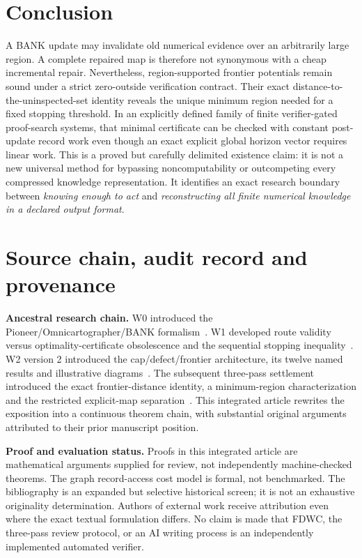 \documentclass[11pt,letterpaper]{article}
\theoremstyle{definition}
\theoremstyle{remark}
\begin{document}
\section{Conclusion}
A BANK update may invalidate old numerical evidence over an arbitrarily large region. A complete repaired map is therefore not synonymous with a cheap incremental repair. Nevertheless, region-supported frontier potentials remain sound under a strict zero-outside verification contract. Their exact distance-to-the-uninspected-set identity reveals the unique minimum region needed for a fixed stopping threshold. In an explicitly defined family of finite verifier-gated proof-search systems, that minimal certificate can be checked with constant post-update record work even though an exact explicit global horizon vector requires linear work. This is a proved but carefully delimited existence claim: it is not a new universal method for bypassing noncomputability or outcompeting every compressed knowledge representation. It identifies an exact research boundary between \emph{knowing enough to act} and \emph{reconstructing all finite numerical knowledge in a declared output format}.

\appendix
\section{Source chain, audit record and provenance}
\textbf{Ancestral research chain.} W0 introduced the Pioneer/Omnicartographer/BANK formalism~\cite{W0}. W1 developed route validity versus optimality-certificate obsolescence and the sequential stopping inequality~\cite{W1}. W2 version 2 introduced the cap/defect/frontier architecture, its twelve named results and illustrative diagrams~\cite{W2}. The subsequent three-pass settlement introduced the exact frontier-distance identity, a minimum-region characterization and the restricted explicit-map separation~\cite{Settlement}. This integrated article rewrites the exposition into a continuous theorem chain, with substantial original arguments attributed to their prior manuscript position.

\textbf{Proof and evaluation status.} Proofs in this integrated article are mathematical arguments supplied for review, not independently machine-checked theorems. The graph record-access cost model is formal, not benchmarked. The bibliography is an expanded but selective historical screen; it is not an exhaustive originality determination. Authors of external work receive attribution even where the exact textual formulation differs. No claim is made that FDWC, the three-pass review protocol, or an AI writing process is an independently implemented automated verifier.
\end{document}
